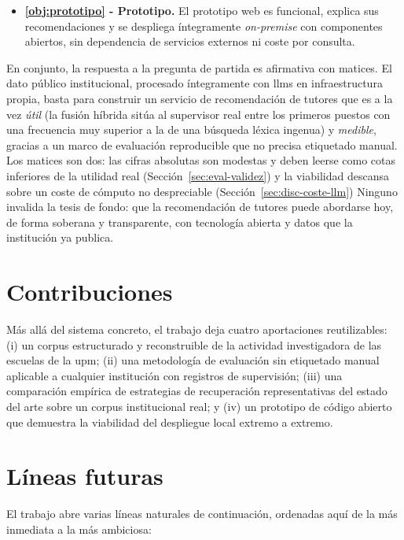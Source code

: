 \begin{itemize}
    El modelo de lenguaje en consulta aporta en ambas vías.
    \item \textbf{\ref{obj:prototipo} - Prototipo.}
    El prototipo web es funcional, explica sus recomendaciones y se despliega íntegramente \emph{on-premise} con componentes abiertos, sin dependencia de servicios externos ni coste por consulta.
\end{itemize}

En conjunto, la respuesta a la pregunta de partida es afirmativa con matices.
El dato público institucional, procesado íntegramente con \glspl{llm} en infraestructura propia, basta para construir un servicio de recomendación de tutores que es a la vez \emph{útil} (la fusión híbrida sitúa al supervisor real entre los primeros puestos con una frecuencia muy superior a la de una búsqueda léxica ingenua) y \emph{medible}, gracias a un marco de evaluación reproducible que no precisa etiquetado manual.
Los matices son dos: las cifras absolutas son modestas y deben leerse como cotas inferiores de la utilidad real (Sección~\ref{sec:eval-validez}) y la viabilidad descansa sobre un coste de cómputo no despreciable (Sección~\ref{sec:disc-coste-llm})
Ninguno invalida la tesis de fondo: que la recomendación de tutores puede abordarse hoy, de forma soberana y transparente, con tecnología abierta y datos que la institución ya publica.

\section{Contribuciones}
\label{sec:conc-contribuciones}

Más allá del sistema concreto, el trabajo deja cuatro aportaciones reutilizables: (i) un corpus estructurado y reconstruible de la actividad investigadora de las escuelas de la \gls{upm}; (ii) una metodología de evaluación sin etiquetado manual aplicable a cualquier institución con registros de supervisión; (iii) una comparación empírica de estrategias de recuperación representativas del estado del arte sobre un corpus institucional real; y (iv) un prototipo de código abierto que demuestra la viabilidad del despliegue local extremo a extremo.

\section{Líneas futuras}
\label{sec:conc-futuro}

El trabajo abre varias líneas naturales de continuación, ordenadas aquí de la más inmediata a la más ambiciosa:

